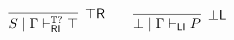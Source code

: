 \documentclass[submission,copyright,creativecommons]{eptcs}
\theoremstyle{definition}
\newcommand{\tl}{\otimes \mathsf{L}}
\newcommand{\tr}{\otimes \mathsf{R}}
\newcommand{\pass}{\mathsf{pass}}
\newcommand{\unitl}{\mathsf{IL}}
\newcommand{\unitr}{\mathsf{IR}}
\newcommand{\andlone}{\land \mathsf{L}_{1}}
\newcommand{\andltwo}{\land \mathsf{L}_{2}}
\newcommand{\andr}{\land \mathsf{R}}
\newcommand{\orl}{\lor \mathsf{L}}
\newcommand{\orrone}{\lor \mathsf{R}_{1}}
\newcommand{\orrtwo}{\lor \mathsf{R}_{2}}
\newcommand{\ax}{\mathsf{ax}}
\newcommand{\ot}{\otimes}
\newcommand{\I}{\mathsf{I}}
\newcommand{\RI}{\mathsf{RI}}
\newcommand{\LI}{\mathsf{LI}}
\newcommand{\F}{\mathsf{F}}
\newcommand{\tP}{\mathbb{P}}
\newcommand{\tL}{\mathbb{L}}
\newcommand{\tR}{\mathbb{R}}
\newcommand{\tE}{\mathbb{E}}
\newcommand{\tT}{\mathbb{T}}
\newcommand{\topr}{\top \mathsf{R}}
\newcommand{\botl}{\bot \mathsf{L}}
\newcommand{\proofbox}[1]{\begin{tabular}{l} #1 \end{tabular}}
\begin{document}
\begin{equation*}\label{eq:focus:units}
  \begin{array}{c}
    \infer[\topr]{S \mid \Gamma \vdash^{\tT?}_{\RI} \top}{}
    \qquad
    \infer[\botl]{\bot \mid \Gamma \vdash_{\LI} P}{}
  \end{array}
\end{equation*}
\end{document}
